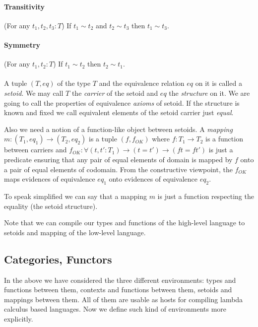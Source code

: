 \documentclass[11pt,oneside]{article}
\begin{document}
\paragraph{Transitivity}
(For any $t_1, t_2, t_3 : T$) If $t_1 \sim t_2$ and $t_2 \sim t_3$  then  $t_1 \sim t_3$.

\paragraph{Symmetry}
(For any $t_1, t_2 : T$) If $t_1 \sim t_2$ then $t_2 \sim t_1$.

\paragraph{}
A tuple $(T, eq)$ of the type $T$ and the equivalence relation $eq$ on it
is called a {\em setoid}.
We may call $T$ the {\em carrier} of the setoid and $eq$ the {\em structure} on it.
We are going to call the properties of equivalence {\em axioms} of setoid.
If the structure is known and fixed we call equivalent elements
of the setoid carrier just {\em equal}.

Also we need a notion of a function-like object between setoids.
A {\em mapping} $m : (T_1, eq_1) \rightarrow (T_2, eq_2)$ is a tuple
$(f, f_{OK})$ where $f : T_1 \rightarrow T_2$ is a function between carriers and
$f_{OK} : \forall (t, t' : T_1) \rightarrow (t = t') \rightarrow (f t = f t')$
is just a predicate ensuring that any pair of equal elements of domain
is mapped by $f$ onto a pair of equal elements of codomain.
From the constructive viewpoint, the $f_{OK}$ maps evidences of
equivalence $eq_1$ onto evidences of equivalence $eq_2$.

To speak simplified we can say that a mapping $m$ is just a function
respecting the equality (the setoid structure).

Note that we can compile our types and functions of the high-level language to setoids and mapping of the low-level language.

\subsection{Categories, Functors}

In the above we have considered the three different environments:
types and functions between them,
contexts and functions between them,
setoids and mappings between them.
All of them are usable as hosts for compiling lambda calculus
based languages.
Now we define such kind of environments more explicitly.
\end{document}
